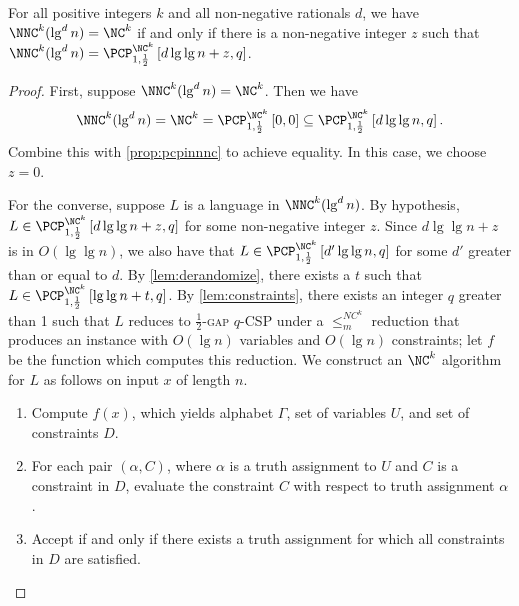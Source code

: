 \documentclass[]{article}
\newcommand{\PCPcs}[5]{\PCP^{#1}_{#2, #3}\left[#4, #5\right]}
\begin{document}
\begin{lemma}\label{lem:1}
  For all positive integers $k$ and all non-negative rationals $d$, we have $\NNC^k(\lg^d n) = \NC^k$ if and only if there is a non-negative integer $z$ such that $\NNC^k(\lg^d n) = \PCPcs{\NC^k}{1}{\frac{1}{2}}{d \lg \lg n + z}{q}$.
\end{lemma}
\begin{proof}
  First, suppose $\NNC^k(\lg^d n) = \NC^k$.
  Then we have
  \begin{equation*}
    \NNC^k(\lg^d n)
    = \NC^k
    = \PCPcs{\NC^k}{1}{\frac{1}{2}}{0}{0}
    \subseteq \PCPcs{\NC^k}{1}{\frac{1}{2}}{d \lg \lg n}{q}.
  \end{equation*}
  Combine this with \autoref{prop:pcpinnnc} to achieve equality.
  In this case, we choose $z = 0$.

  For the converse, suppose $L$ is a language in $\NNC^k(\lg^d n)$.
  By hypothesis, $L \in \PCPcs{\NC^k}{1}{\frac{1}{2}}{d \lg \lg n + z}{q}$ for some non-negative integer $z$.
  Since $d \lg \lg n + z$ is in $O(\lg \lg n)$, we also have that $L \in \PCPcs{\NC^k}{1}{\frac{1}{2}}{d' \lg \lg n}{q}$ for some $d'$ greater than or equal to $d$.
  By \autoref{lem:derandomize}, there exists a $t$ such that $L \in \PCPcs{\NC^k}{1}{\frac{1}{2}}{\lg \lg n + t}{q}$.
  By \autoref{lem:constraints}, there exists an integer $q$ greater than 1 such that $L$ reduces to \textsc{$\frac{1}{2}$-gap $q$-CSP} under a $\leq_m^{NC^k}$ reduction that produces an instance with $O(\lg n)$ variables and $O(\lg n)$ constraints; let $f$ be the function which computes this reduction.
  We construct an $\NC^k$ algorithm for $L$ as follows on input $x$ of length $n$.
  \begin{enumerate}
  \item Compute $f(x)$, which yields alphabet $\Gamma$, set of variables $U$, and set of constraints $D$.
  \item For each pair $(\alpha, C)$, where $\alpha$ is a truth assignment to $U$ and $C$ is a constraint in $D$, evaluate the constraint $C$ with respect to truth assignment $\alpha$.
  \item Accept if and only if there exists a truth assignment for which all constraints in $D$ are satisfied.
  \end{enumerate}


\end{proof}
\end{document}
